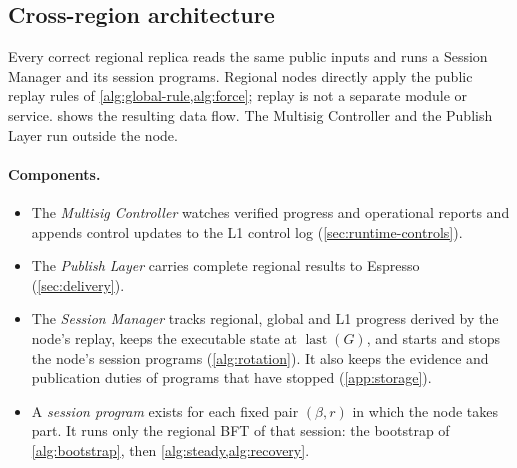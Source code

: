 \documentclass[11pt,a4paper]{article}
\newcommand{\defterm}[1]{\textcolor{rrBlue}{\textit{#1}}}
\begin{document}
\subsection{Cross-region architecture}
\label{sec:runtime-modules}
Every correct regional replica reads the same public inputs and runs a
Session Manager and its session programs. Regional nodes directly apply
the public replay rules of \cref{alg:global-rule,alg:force}; replay is not a separate
module or service.   shows the resulting data
flow. The Multisig Controller and the Publish Layer run outside the
node.

\paragraph{Components.}
\begin{itemize}
\item The \defterm{Multisig Controller} watches verified progress and
operational reports and appends control updates to the L1 control log
(\cref{sec:runtime-controls}).
\item The \defterm{Publish Layer} carries complete regional results to
Espresso (\cref{sec:delivery}).
\item The \defterm{Session Manager} tracks regional, global and L1
progress derived by the node's replay, keeps the executable state at
$\operatorname{last}(G)$, and starts and stops the node's session
programs (\cref{alg:rotation}). It also keeps the evidence and
publication duties of programs that have stopped (\cref{app:storage}).
\item A \defterm{session program} exists for each fixed pair
$(\beta,r)$ in which the node takes part. It runs only the regional BFT
of that session: the bootstrap of \cref{alg:bootstrap}, then
\cref{alg:steady,alg:recovery}.
\end{itemize}
\end{document}
